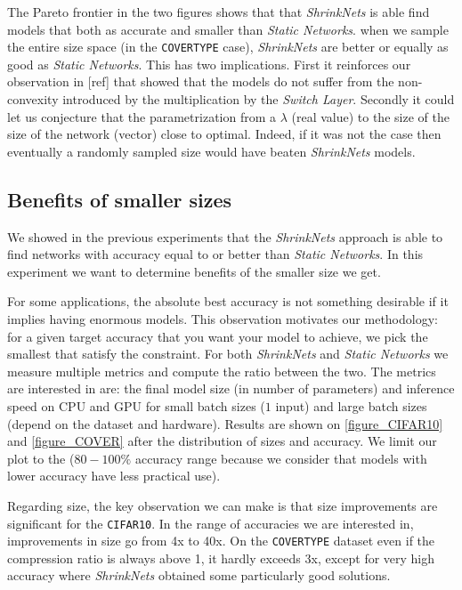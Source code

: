 
The Pareto frontier in the two figures shows that 
that  \textit{ShrinkNets} is able find models that both as accurate and smaller than
\textit{Static Networks}.
when we sample the entire size space (in the \texttt{COVERTYPE} case),
\textit{ShrinkNets} are better or equally as good as \textit{Static Networks}.
This has two implications. First it reinforces our observation  in [ref] that
showed that the models do not suffer from the non-convexity introduced by the
multiplication by the \textit{Switch Layer}. Secondly it could let us conjecture
that the parametrization from a $\lambda$ (real value) to the size of the
size of the network (vector) close to optimal. Indeed, if it was
not the case then eventually a randomly sampled size would have beaten
\textit{ShrinkNets} models.  

\subsection{Benefits of smaller sizes}

We showed in the previous experiments that the \textit{ShrinkNets} approach is able to find
networks with accuracy equal to or better than \textit{Static Networks}. In this experiment we
want to determine benefits of the smaller size we get.

For some applications, the absolute best accuracy is not something desirable if
it implies having enormous models. This observation motivates our methodology:
for a given target accuracy that you want your model to achieve, we pick the
smallest that satisfy the constraint. For both \textit{ShrinkNets} and
\textit{Static Networks} we measure multiple metrics and compute the ratio
between the two. The metrics are interested in are: the final model size (in
number of parameters) and inference speed on CPU and GPU for small batch sizes
($1$ input) and large batch sizes (depend on the dataset and hardware). Results
are shown on \cref{figure_CIFAR10} and \cref{figure_COVER} after the
distribution of sizes and accuracy. We limit our plot to the ($80-100\%$
accuracy range because we consider that models with lower accuracy have less
practical use).

Regarding size, the key observation we can make is that size improvements are
significant for the \texttt{CIFAR10}. In the range of accuracies we are
interested in, improvements in size go from 4x to 40x. On the \texttt{COVERTYPE}
dataset even if the compression ratio is always above 1, it hardly exceeds 3x,
except for very high accuracy where \textit{ShrinkNets} obtained some
particularly good solutions.

